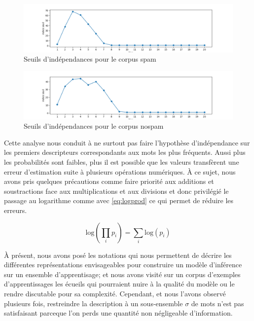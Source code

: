 \documentclass[a4paper, french]{article}
\begin{document}
\begin{figure}[h]
\begin{center}
    \caption{Seuils d'ind\'ependances pour le corpus spam}
    \label{fig:seuils_indes_spam}
    \includegraphics[width=15cm]{seuils_indes_nospam}
\end{center}
\end{figure}

\begin{figure}[h]
\begin{center}
    \caption{Seuils d'ind\'ependances pour le corpus nospam}
    \label{fig:seuils_indes_nospam}
    \includegraphics[width=15cm]{seuils_indes_spam}
\end{center}
\end{figure}

Cette analyse nous conduit \`a ne surtout pas faire l'hypoth\`ese
d'ind\'ependance sur les premiers descripteurs correspondants aux mots
les plus fr\'equents. Aussi plus les probabilit\'es sont faibles, plus il
est possible que les valeurs transf\`erent une erreur d'estimation suite \`a
plusieurs op\'erations num\'eriques. \`A ce sujet, nous avons pris quelques
pr\'ecautions comme faire priorit\'e aux additions et soustractions face aux
multiplications et aux divisions et donc privil\'egi\'e le passage au
logarithme comme avec \eqref{eq:logprod} ce qui permet de r\'eduire les erreurs.

\begin{equation}
    \text{log}\left(\prod _i p_i\right) = \sum _i \text{log}(p_i)
    \label{eq:logprod}
\end{equation}

\`A pr\'esent, nous avons pos\'e les notations qui nous permettent
de d\'ecrire les diff\'erentes repr\'esentations envisageables pour
construire un mod\`ele d'inf\'erence sur un ensemble d'apprentisage;
et nous avons visit\'e sur un corpus d'exemples d'apprentissages les
\'ecueils qui pourraient nuire \`a la qualit\'e du mod\`ele ou le rendre
discutable pour sa complexit\'e. Cependant, et nous l'avons observ\'e
plusieurs fois, restreindre la description \`a un sous-ensemble $\sigma$
de mots n'est pas satisfaisant parceque l'on perds une quantit\'e non
n\'egligeable d'information.
\end{document}
